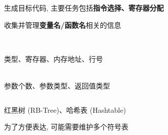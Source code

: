 \begin{frame}{}
  \begin{center}
     生成目标代码, 主要任务包括{\bf 指令选择、寄存器分配}

    \vspace{0.80cm}
  \end{center}
\end{frame}

\begin{frame}{}
  \begin{center}
     收集并管理{\bf 变量名/函数名}相关的信息
  \end{center}

  \begin{columns}
      \begin{center}
         \\[3pt]
        类型、寄存器、内存地址、行号

        \vspace{0.50cm}
         \\[3pt]
        参数个数、参数类型、返回值类型
      \end{center}
  \end{columns}
\end{frame}

\begin{frame}{}

  \vspace{0.50cm}
  \begin{center}
    红黑树 (RB-Tree)、哈希表 (Hashtable)
  \end{center}
\end{frame}

\begin{frame}{}
  \begin{center}
    为了方便表达, 可能需要维护多个符号表
  \end{center}

\end{frame}

